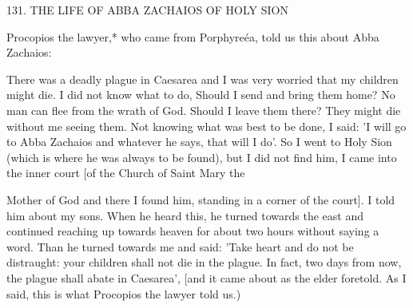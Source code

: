131.
THE LIFE OF ABBA ZACHAIOS OF HOLY SION

Procopios the lawyer,* who came from Porphyreéa, told us this
about Abba Zachaios:

There was a deadly plague in Caesarea and I was very worried that
my children might die.
I did not know what to do, Should I send
and bring them home? No man can flee from the wrath of God.
Should I leave them there? They might die without me seeing them.
Not knowing what was best to be done, I said: 'I will go to Abba
Zachaios and whatever he says, that will I do'.
So I went to Holy
Sion (which is where he was always to be found), but I did not find
him, I came into the inner court [of the Church of Saint Mary the

Mother of God and there I found him, standing in a corner of the
court].
I told him about my sons.
When he heard this, he turned
towards the east and continued reaching up towards heaven for
about two hours without saying a word.
Than he turned towards
me and said: 'Take heart and do not be distraught: your children
shall not die in the plague.
In fact, two days from now, the plague
shall abate in Caesarea', [and it came about as the elder foretold.
As
I said, this is what Procopios the lawyer told us.)

